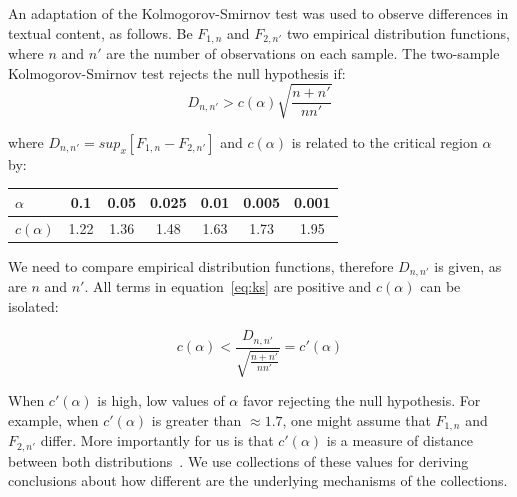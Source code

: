 \documentclass[%
 aip,
 jmp,%
 amsmath,amssymb,
 reprint,%
]{revtex4-1}
\begin{document}
An adaptation of the Kolmogorov-Smirnov test was used to observe differences in textual content, as follows.
Be $F_{1,n}$ and $F_{2,n'}$ two empirical distribution functions, where $n$ and $n'$ are the number of observations on each sample. The two-sample Kolmogorov-Smirnov test rejects the null hypothesis if:
\begin{equation}\label{eq:ks}
D_{n,n'} > c(\alpha)\sqrt{\frac{n+n'}{nn'}}
\end{equation}

\noindent where $D_{n,n'}=sup_x[F_{1,n}-F_{2,n'}]$ and $c(\alpha)$ is related to the critical region $\alpha$ by:

\begin{table}[H]
\centering
\begin{tabular}{|l||c|c|c|c|c|c|}\hline
$\alpha$    & 0.1  & 0.05 & 0.025 & 0.01 & 0.005 & 0.001 \\\hline
$c(\alpha)$ & 1.22 & 1.36 & 1.48  & 1.63 & 1.73  & 1.95  \\\hline
\end{tabular}
\end{table}

We need to compare empirical distribution functions, therefore $D_{n,n'}$ is given, as are $n$ and $n'$. All terms in equation~\ref{eq:ks} are positive and $c(\alpha)$ can be isolated:

\begin{equation}\label{eq:ks2}
c(\alpha) < \frac{D_{n,n'}}{\sqrt{\frac{n+n'}{nn'}}} = c'(\alpha)
\end{equation}

When $c'(\alpha)$ is high, low values of $\alpha$ favor rejecting the null hypothesis.
For example, when $c'(\alpha)$ is greater than $\approx 1.7$, one might assume that $F_{1,n}$ and $F_{2,n'}$ differ.
More importantly for us is that $c'(\alpha)$ is a measure of distance between both distributions~\cite{kolm}.
We use collections of these values for deriving conclusions
about how different are the underlying mechanisms of the collections.
\end{document}
